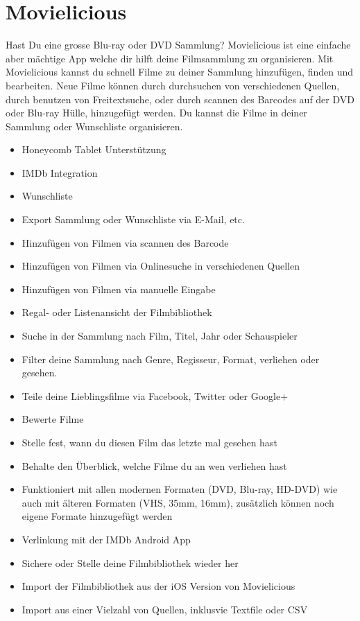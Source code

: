 \section{Movielicious}

Hast Du eine grosse Blu-ray oder DVD Sammlung? Movielicious ist eine einfache aber mächtige App welche dir hilft deine Filmsammlung zu organisieren. Mit Movielicious kannst du schnell Filme zu deiner Sammlung hinzufügen, finden und bearbeiten. Neue Filme können durch durchsuchen von verschiedenen Quellen, durch benutzen von Freitextsuche, oder durch scannen des Barcodes auf der DVD oder Blu-ray Hülle, hinzugefügt werden. Du kannst die Filme in deiner Sammlung oder Wunschliste organisieren.\cite{Movielicious}

\begin{itemize}
	\item Honeycomb Tablet Unterstützung
	\item IMDb Integration
	\item Wunschliste
	\item Export Sammlung oder Wunschliste via E-Mail, etc.
	\item Hinzufügen von Filmen via scannen des Barcode
	\item Hinzufügen von Filmen via Onlinesuche in verschiedenen Quellen
	\item Hinzufügen von Filmen via manuelle Eingabe
	\item Regal- oder Listenansicht der Filmbibliothek
	\item Suche in der Sammlung nach Film, Titel, Jahr oder Schauspieler
	\item Filter deine Sammlung nach Genre, Regisseur, Format, verliehen oder gesehen.
	\item Teile deine Lieblingsfilme via Facebook, Twitter oder Google+
	\item Bewerte Filme
	\item Stelle fest, wann du diesen Film das letzte mal gesehen hast
	\item Behalte den Überblick, welche Filme du an wen verliehen hast
	\item Funktioniert mit allen modernen Formaten (DVD, Blu-ray, HD-DVD) wie auch mit älteren Formaten (VHS, 35mm, 16mm), zusätzlich können noch eigene Formate hinzugefügt werden
	\item Verlinkung mit der IMDb Android App
	\item Sichere oder Stelle deine Filmbibliothek wieder her
	\item Import der Filmbibliothek aus der iOS Version von Movielicious
	\item Import aus einer Vielzahl von Quellen, inklusvie Textfile oder CSV
\end{itemize}

